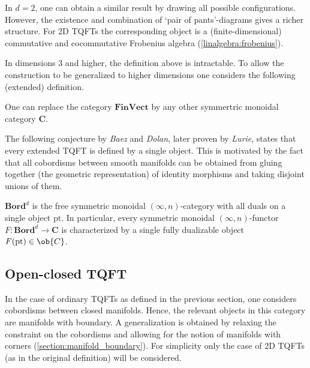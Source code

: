     \begin{example}[2D]
        In $d=2$, one can obtain a similar result by drawing all possible configurations. However, the existence and combination of `pair of pants'-diagrams gives a richer structure. For 2D TQFTs the corresponding object is a (finite-dimensional) commutative and cocommutative Frobenius algebra (\cref{linalgebra:frobenius}).
    \end{example}

    In dimensions 3 and higher, the definition above is intractable. To allow the construction to be generalized to higher dimensions one considers the following (extended) definition.
    \begin{remark}
        One can replace the category $\mathbf{FinVect}$ by any other symmertric monoidal category $\mathbf{C}$.
    \end{remark}

    The following conjecture by \textit{Baez} and \textit{Dolan}, later proven by \textit{Lurie}, states that every extended TQFT is defined by a single object. This is motivated by the fact that all cobordisms between smooth manifolds can be obtained from gluing together (the geometric representation) of identity morphisms and taking disjoint unions of them.
    \begin{theorem}
        $\mathbf{Bord}^d$ is the free symmetric monoidal $(\infty,n)$-category with all duals on a single object $\mathrm{pt}$. In particular, every symmetric monoidal $(\infty,n)$-functor $F:\mathbf{Bord}^d\rightarrow\mathbf{C}$ is characterized by a single fully dualizable object $F(\mathrm{pt})\in\ob{C}$.
    \end{theorem}

\subsection{Open-closed TQFT}

    In the case of ordinary TQFTs as defined in the previous section, one considers cobordisms between closed manifolds. Hence, the relevant objects in this category are manifolds with boundary. A generalization is obtained by relaxing the constraint on the cobordisms and allowing for the notion of manifolds with corners (\cref{section:manifold_boundary}). For simplicity only the case of 2D TQFTs (as in the original definition) will be considered.

